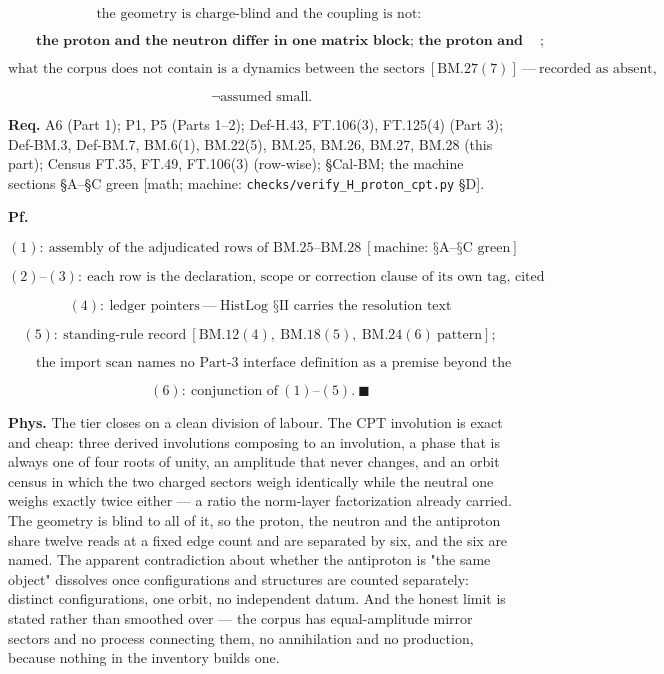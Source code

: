 \documentclass[11pt,openany]{report}
\theoremstyle{canonplain}
\theoremstyle{canondef}
\begin{document}
\[
\text{the geometry is charge-blind and the coupling is not}:
\]

\[
\qquad \textbf{the proton and the neutron differ in one matrix block; the proton and the antiproton differ in one sign and one orientation};
\]

\[
\text{what the corpus does not contain is a dynamics between the sectors}\ [\mathrm{BM.27}(7)]\ —\ \text{recorded as absent},
\]

\[
\ \neg\text{assumed small}.
\]

\textbf{Req.} A6 (Part 1); P1, P5 (Parts 1–2); Def-H.43, FT.106(3), FT.125(4) (Part 3); Def-BM.3, Def-BM.7, BM.6(1), BM.22(5), BM.25, BM.26, BM.27, BM.28 (this part); Census FT.35, FT.49, FT.106(3) (row-wise); §Cal-BM; the machine sections §A–§C green [math; machine: \texttt{checks/\allowbreak{}verify\_\allowbreak{}H\_\allowbreak{}proton\_\allowbreak{}cpt.py} §D].

\textbf{Pf.}

\[
(1):\ \text{assembly of the adjudicated rows of BM.25–BM.28}\ [\text{machine: §A–§C green}]
\]

\[
(2)\text{–}(3):\ \text{each row is the declaration, scope or correction clause of its own tag, cited unmodified}
\]

\[
(4):\ \text{ledger pointers}\ —\ \text{HistLog §II carries the resolution text}
\]

\[
(5):\ \text{standing-rule record}\ [\mathrm{BM.12}(4),\ \mathrm{BM.18}(5),\ \mathrm{BM.24}(6)\ \text{pattern}];
\]

\[
\qquad \text{the import scan names no Part-3 interface definition as a premise beyond the dispositioned ones}
\]

\[
(6):\ \text{conjunction of}\ (1)\text{–}(5).\ \blacksquare
\]

\textbf{Phys.} The tier closes on a clean division of labour. The CPT involution is exact and cheap: three derived involutions composing to an involution, a phase that is always one of four roots of unity, an amplitude that never changes, and an orbit census in which the two charged sectors weigh identically while the neutral one weighs exactly twice either — a ratio the norm-layer factorization already carried. The geometry is blind to all of it, so the proton, the neutron and the antiproton share twelve reads at a fixed edge count and are separated by six, and the six are named. The apparent contradiction about whether the antiproton is "the same object" dissolves once configurations and structures are counted separately: distinct configurations, one orbit, no independent datum. And the honest limit is stated rather than smoothed over — the corpus has equal-amplitude mirror sectors and no process connecting them, no annihilation and no production, because nothing in the inventory builds one.
\end{document}

